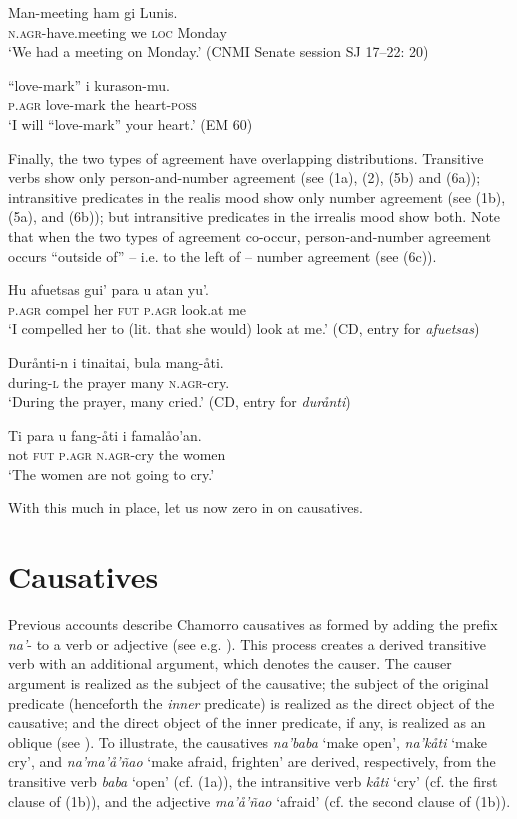 \documentclass[output=paper,
modfonts
]{LSP/langsci}
\begin{document}
\begin{exe}
\begin{xlist}
\ea
\ea
\gll Man-meeting ham gi Lunis.\\
\textsc{n.agr-}have.meeting we \textsc{loc} Monday\\
\glt `We had a meeting on Monday.' (CNMI Senate session SJ 17--22: 20)

\ex {} ``love-mark'' i kurason-mu.\\
\textsc{p.agr} love-mark the heart-\textsc{poss}\\
\glt `I will ``love-mark'' your heart.' (EM 60)
\z
\z

Finally, the two types of agreement have overlapping distributions.
Transitive verbs show only person-and-number agreement (see (1a), (2),
(5b) and (6a)); intransitive predicates in the realis mood show only
number agreement (see (1b), (5a), and (6b)); but intransitive predicates
in the irrealis mood show both. Note that when the two types of
agreement co-occur, person-and-number agreement occurs ``outside
of'' -- i.e. to the left of -- number agreement (see (6c)).

\ea
\ea
\gll Hu afuetsas gui' para u atan yu'.\\
\textsc{p.agr} compel her \textsc{fut} \textsc{p.agr} look.at me\\
\glt `I compelled her to (lit. that she would) look at me.' (CD, entry for \emph{afuetsas})

\ex \gll Durånti-n i tinaitai, bula mang-åti.\\
during-\textsc{l} the prayer many \textsc{n.agr}-cry.\\
\glt `During the prayer, many cried.' (CD, entry for \emph{durånti})

\ex \gll Ti para u fang-åti i famalåo'an.\\
not \textsc{fut} \textsc{p.agr n.agr}-cry the women\\
\glt `The women are not going to cry.'
\z
\z 

With this much in place, let us now zero in on causatives.

\section{Causatives}

Previous accounts describe Chamorro causatives as formed by adding the
prefix \emph{na'}- to a verb or adjective (see e.g. \citealt{baker1985,gibson1980,safford1904,topping1973}). This process creates a
derived transitive verb with an additional argument, which denotes the
causer. The causer argument is realized as the subject of the causative;
the subject of the original predicate (henceforth the \emph{inner}
predicate) is realized as the direct object of the causative; and the
direct object of the inner predicate, if any, is realized as an oblique
(see \citealt{gibson1980}). To illustrate, the causatives \emph{na'baba} `make
open', \emph{na'kåti} `make cry', and \emph{na'ma'å'ñao} `make afraid,
frighten' are derived, respectively, from the transitive verb
\emph{baba} `open' (cf. (1a)), the intransitive verb \emph{kåti} `cry'
(cf. the first clause of (1b)), and the adjective \emph{ma'å'ñao}
`afraid' (cf. the second clause of (1b)).


\end{xlist}
\end{exe}
\end{document}
